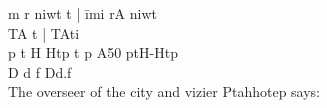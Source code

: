 m r niwt t |		\=		imi rA niwt\\
TA t |				\>		TAti	\\	
p t H Htp t p A50	\>		ptH-Htp	\\
D d f				\>		Dd.f		\\

The overseer of the city and vizier Ptahhotep says: